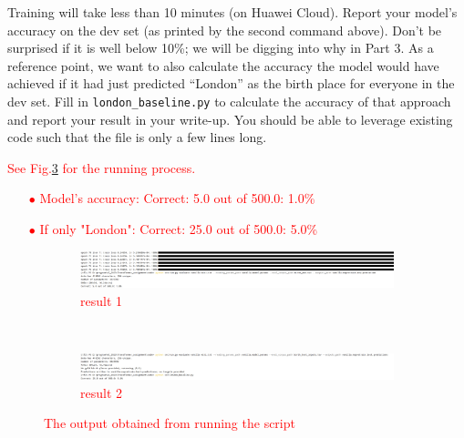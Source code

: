 \documentclass[letterpaper,12pt]{article}
\begin{document}
\begin{itemize}
		Training will take less than 10 minutes (on Huawei Cloud).  Report your model's accuracy on the dev set (as printed by the second command above). Don't be surprised if it is well below 10\%; we will be digging into why in Part 3. As a reference point, we want to also calculate the accuracy the model would have achieved if it had just predicted ``London'' as the birth place for everyone in the dev set. Fill in \texttt{london\_baseline.py} to calculate the accuracy of that approach and report your result in your write-up. You should be able to leverage existing code such that the file is only a few lines long. 
		
		\textcolor{red}{ See Fig.\ref{fig: 2.d.result} for the running process.
		\begin{itemize}
			\item [$ \bullet $] Model's accuracy: Correct: 5.0 out of 500.0: 1.0\%
			\item [$ \bullet $] If only "London": Correct: 25.0 out of 500.0: 5.0\%
		\end{itemize}
		\begin{figure}[htbp] 
			\centering 
			\begin{subfigure}{\textwidth}
				\includegraphics[width=\linewidth]{picture/2.d.result.1}
				\captionsetup{font=scriptsize}
				\caption{result 1}
				\label{fig: 2.d.result.1}
			\end{subfigure} \\
			\begin{subfigure}{\textwidth}
				\includegraphics[width=\linewidth]{picture/2.d.result.2}
				\captionsetup{font=scriptsize}
				\caption{result 2}
				\label{fig: 2.d.result.2}
			\end{subfigure}
			\captionsetup{font=scriptsize}
			\caption{
				\label{fig: 2.d.result} 
				The output obtained from running the script
			}
		\end{figure}
		}
		

\end{itemize}
\end{document}

